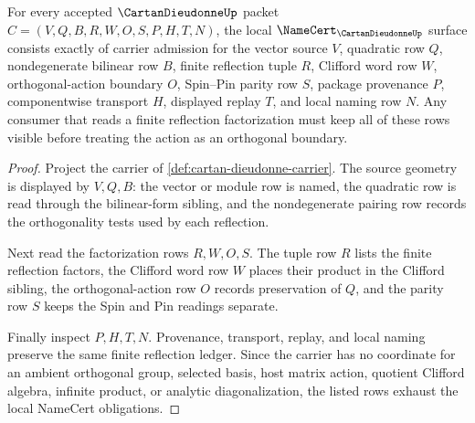 \begin{theorem}
\label{thm:cartan-dieudonne-namecert-obligations}
For every accepted $\CartanDieudonneUp$ packet $C=(V,Q,B,R,W,O,S,P,H,T,N)$, the local $\NameCert_{\CartanDieudonneUp}$ surface consists exactly of carrier admission for the vector source $V$, quadratic row $Q$, nondegenerate bilinear row $B$, finite reflection tuple $R$, Clifford word row $W$, orthogonal-action boundary $O$, Spin--Pin parity row $S$, package provenance $P$, componentwise transport $H$, displayed replay $T$, and local naming row $N$. Any consumer that reads a finite reflection factorization must keep all of these rows visible before treating the action as an orthogonal boundary.
\end{theorem}
\begin{proof}
Project the carrier of \autoref{def:cartan-dieudonne-carrier}. The source geometry is displayed by $V,Q,B$: the vector or module row is named, the quadratic row is read through the bilinear-form sibling, and the nondegenerate pairing row records the orthogonality tests used by each reflection.

Next read the factorization rows $R,W,O,S$. The tuple row $R$ lists the finite reflection factors, the Clifford word row $W$ places their product in the Clifford sibling, the orthogonal-action row $O$ records preservation of $Q$, and the parity row $S$ keeps the Spin and Pin readings separate.

Finally inspect $P,H,T,N$. Provenance, transport, replay, and local naming preserve the same finite reflection ledger. Since the carrier has no coordinate for an ambient orthogonal group, selected basis, host matrix action, quotient Clifford algebra, infinite product, or analytic diagonalization, the listed rows exhaust the local NameCert obligations.
\end{proof}



